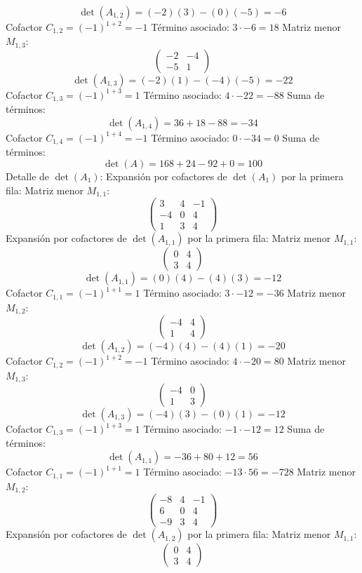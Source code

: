 \documentclass{article}
\begin{document}
\[\det(A_{1,2}) = (-2)(3) - (0)(-5) = -6\]
Cofactor $C_{1,2} = (-1)^{1+2} = -1$
Término asociado: $ 3 \cdot -6 = 18 $
Matriz menor $M_{1,3}$:
\[\begin{pmatrix}-2 & -4 \\ -5 & 1\end{pmatrix}\]
\[\det(A_{1,3}) = (-2)(1) - (-4)(-5) = -22\]
Cofactor $C_{1,3} = (-1)^{1+3} = 1$
Término asociado: $ 4 \cdot -22 = -88 $
Suma de términos:
\[\det(A_{1,4}) = 36 + 18 - 88 = -34\]
Cofactor $C_{1,4} = (-1)^{1+4} = -1$
Término asociado: $ 0 \cdot -34 = 0 $
Suma de términos:
\[\det(A) = 168 + 24 - 92 + 0 = 100\]
Detalle de $\det(A_{1})$:
Expansión por cofactores de $\det(A_{1})$ por la primera fila:
Matriz menor $M_{1,1}$:
\[\begin{pmatrix}3 & 4 & -1 \\ -4 & 0 & 4 \\ 1 & 3 & 4\end{pmatrix}\]
Expansión por cofactores de $\det(A_{1,1})$ por la primera fila:
Matriz menor $M_{1,1}$:
\[\begin{pmatrix}0 & 4 \\ 3 & 4\end{pmatrix}\]
\[\det(A_{1,1}) = (0)(4) - (4)(3) = -12\]
Cofactor $C_{1,1} = (-1)^{1+1} = 1$
Término asociado: $ 3 \cdot -12 = -36 $
Matriz menor $M_{1,2}$:
\[\begin{pmatrix}-4 & 4 \\ 1 & 4\end{pmatrix}\]
\[\det(A_{1,2}) = (-4)(4) - (4)(1) = -20\]
Cofactor $C_{1,2} = (-1)^{1+2} = -1$
Término asociado: $ 4 \cdot -20 = 80 $
Matriz menor $M_{1,3}$:
\[\begin{pmatrix}-4 & 0 \\ 1 & 3\end{pmatrix}\]
\[\det(A_{1,3}) = (-4)(3) - (0)(1) = -12\]
Cofactor $C_{1,3} = (-1)^{1+3} = 1$
Término asociado: $ -1 \cdot -12 = 12 $
Suma de términos:
\[\det(A_{1,1}) = -36 + 80 + 12 = 56\]
Cofactor $C_{1,1} = (-1)^{1+1} = 1$
Término asociado: $ -13 \cdot 56 = -728 $
Matriz menor $M_{1,2}$:
\[\begin{pmatrix}-8 & 4 & -1 \\ 6 & 0 & 4 \\ -9 & 3 & 4\end{pmatrix}\]
Expansión por cofactores de $\det(A_{1,2})$ por la primera fila:
Matriz menor $M_{1,1}$:
\[\begin{pmatrix}0 & 4 \\ 3 & 4\end{pmatrix}\]
\end{document}
